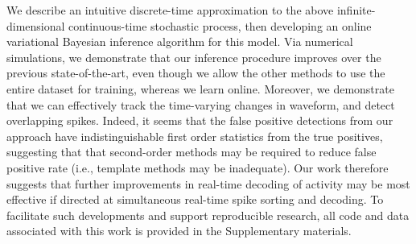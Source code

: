 We describe an intuitive discrete-time approximation to the above infinite-dimensional continuous-time stochastic process, %
then developing an online variational Bayesian inference algorithm for this model.  
Via numerical simulations, we demonstrate that our inference procedure improves over the previous state-of-the-art,
even though we allow the other methods to use the entire dataset for training, whereas we learn online.  
Moreover, we demonstrate that we can effectively track the time-varying changes in waveform, and detect overlapping spikes.  
Indeed, it seems that the false positive detections from our approach have indistinguishable first order statistics from the true positives, suggesting that that second-order methods may be required to reduce false positive rate (i.e., template methods may be inadequate).  Our work therefore suggests that further improvements in real-time decoding of activity may be most effective if directed at simultaneous real-time spike sorting and decoding.  To facilitate such developments and support reproducible research, all code and data associated with this work is provided in the Supplementary materials.


